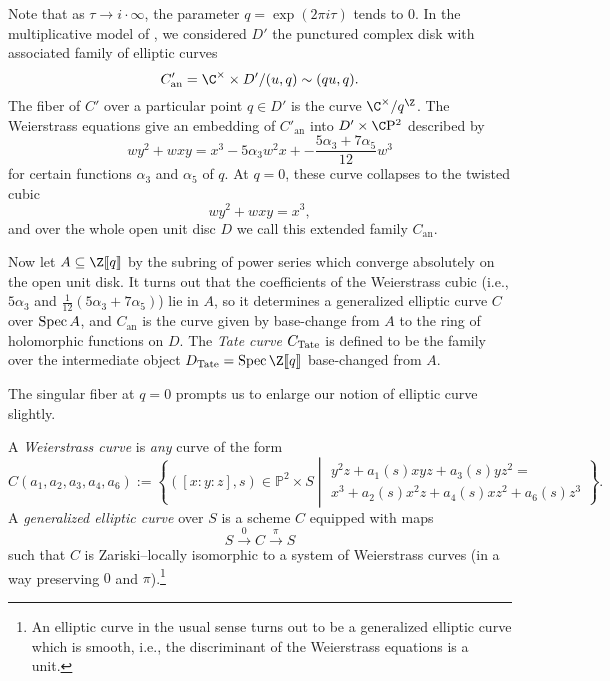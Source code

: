 \begin{definition}
Note that as $\tau \to i \cdot \infty$, the parameter $q = \exp(2 \pi i \tau)$ tends to $0$.  In the multiplicative model of , we considered $D'$ the punctured complex disk with associated family of elliptic curves \[C'_{\mathrm{an}} = \C^\times \times D' / (u, q) \sim (qu, q).\]  The fiber of $C'$ over a particular point $q \in D'$ is the curve $\C^\times / q^{\Z}$. %
The Weierstrass equations give an embedding of $C'_{\mathrm{an}}$ into $D' \times \CP^2$ described by \[wy^2 + wxy = x^3 - 5 \alpha_3 w^2 x + -\frac{5 \alpha_3 + 7 \alpha_5}{12}w^3\] for certain functions $\alpha_3$ and $\alpha_5$ of $q$.  At $q = 0$, these curve collapses to the twisted cubic \[wy^2 + wxy = x^3,\] and over the whole open unit disc $D$ we call this extended family $C_{\mathrm{an}}$.

Now let $A \subseteq \Z\ps{q}$ by the subring of power series which converge absolutely on the open unit disk.  It turns out that the coefficients of the Weierstrass cubic (i.e., $5\alpha_3$ and $\frac{1}{12}(5\alpha_3+7\alpha_5)$) lie in $A$, so it determines a generalized elliptic curve $C$ over $\operatorname{Spec} A$, and $C_{\mathrm{an}}$ is the curve given by base-change from $A$ to the ring of holomorphic functions on $D$.  The \textit{Tate curve} $C_{\mathrm{Tate}}$ is defined to be the family over the intermediate object $D_{\Tate} = \Spec \Z\ps{q}$ base-changed from $A$.
\end{definition}

The singular fiber at $q = 0$ prompts us to enlarge our notion of elliptic curve slightly.

\begin{definition}
A \textit{Weierstrass curve} is \emph{any} curve of the form \[C(a_1, a_2, a_3, a_4, a_6) := \left\{ ([x : y : z], s) \in \mathbb P^2 \times S \middle| \begin{array}{c} y^2 z + a_1(s) xyz + a_3(s) yz^2 = \\ x^3 + a_2(s) x^2 z + a_4(s) x z^2 + a_6(s) z^3 \end{array} \right\}.\]  A \textit{generalized elliptic curve} over $S$ is a scheme $C$ equipped with maps \[S \xrightarrow{0} C \xrightarrow{\pi} S\] such that $C$ is Zariski--locally isomorphic to a system of Weierstrass curves (in a way preserving $0$ and $\pi$).\footnote{An elliptic curve in the usual sense turns out to be a generalized elliptic curve which is smooth, i.e., the discriminant of the Weierstrass equations is a unit.}
\end{definition}

